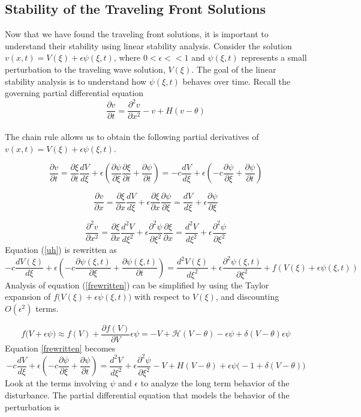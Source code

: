 \documentclass[12pt]{article}
\begin{document}
\subsection{Stability of the Traveling Front Solutions}
Now that we have found the traveling front solutions, it is important to understand their stability using linear stability analysis. Consider the solution $v(x,t)=V(\xi)+\epsilon\psi(\xi,t)$, where $0 < \epsilon <<1$ and $\psi(\xi,t)$ represents a small perturbation to the traveling wave solution, $V(\xi)$. The goal of the linear stability analysis is to understand how $\psi(\xi,t)$ behaves over time. Recall the governing partial differential equation
\begin{equation}
\label{uh}
\frac{\partial v}{\partial t}=\frac{\partial ^2 v}{\partial x^2}-v+H(v-\theta)
\end{equation}
\\
The chain rule allows us to obtain the following partial derivatives of $v(x,t)=V(\xi)+\epsilon\psi(\xi,t)$.

$$\frac{\partial v}{\partial t}=\frac{\partial\xi}{\partial t}\frac{dV}{d\xi}+\epsilon(\frac{\partial \psi}{\partial \xi}\frac{\partial \xi}{\partial t}+\frac{\partial \psi}{\partial t}) = -c\frac{dV}{d\xi}+\epsilon(-c\frac{\partial \psi}{\partial \xi}+\frac{\partial \psi}{\partial t})$$

$$\frac{\partial v}{\partial x}=\frac{\partial \xi}{\partial x}\frac{dV}{d\xi}+\epsilon\frac{\partial\xi}{\partial x}\frac{\partial\psi}{\partial\xi} = \frac{dV}{d\xi}+\epsilon\frac{\partial\psi}{\partial\xi}$$

$$\frac{\partial^2 v}{\partial x^2}=\frac{\partial \xi}{\partial x}\frac{d^2V}{d\xi^2}+\epsilon\frac{\partial^2\psi}{\partial\xi^2}\frac{\partial \xi}{\partial x} = \frac{d^2V}{d\xi^2}+\epsilon\frac{\partial^2\psi}{\partial\xi^2}$$
Equation (\ref{uh}) is rewritten as 
\begin{equation}
\label{frewritten}
-c\frac{dV(\xi)}{d\xi}+\epsilon(-c\frac{\partial \psi(\xi,t)}{\partial \xi}+\frac{\partial \psi(\xi,t)}{\partial t})=\frac{d^2V(\xi)}{d\xi^2}+\epsilon\frac{\partial^2\psi(\xi,t)}{\partial\xi^2}+f(V(\xi)+\epsilon\psi(\xi,t))
\end{equation}
Analysis of equation (\ref{frewritten}) can be simplified by using the Taylor expansion of $f\big(V(\xi)+\epsilon\psi(\xi,t)\big)$ with respect to $V(\xi)$, and discounting $O(\epsilon ^2)$ terms.

$$f\big(V+\epsilon\psi \big) \approx f(V) + \frac{\partial f(V)}{\partial V}\epsilon\psi = -V +\mathcal{H}(V-\theta) - \epsilon\psi + \delta(V-\theta)\epsilon\psi $$
Equation \ref{frewritten} becomes
$$-c\frac{dV}{d\xi}+\epsilon(-c\frac{\partial \psi}{\partial \xi}+\frac{\partial \psi}{\partial t})= 
\frac{d^2V}{d\xi^2}+\epsilon\frac{\partial^2\psi}{\partial\xi^2}-V+H(V-\theta)+\epsilon\psi\big(-1+\delta(V-\theta)\big)$$
Look at the terms involving $\psi$ and $\epsilon$ to analyze the long term behavior of the disturbance. The partial differential equation that models the behavior of the perturbation is
\end{document}
